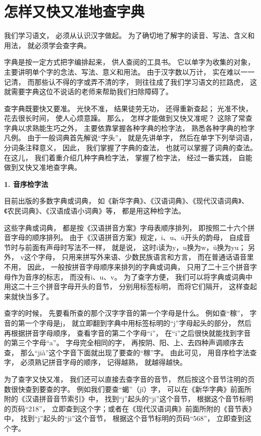 \section{怎样又快又准地查字典}

我们学习语文，
必须从认识汉字做起。
为了确切地了解字的读音、写法、含义和用法，
就必须学会查字典。

字典是按一定方式把字编排起来，
供人查阅的工具书。
它以单字为收集的对象，
主要讲明单个字的念法、写法、意义和用法。
由于汉字数以万计，
实在难以一一记清，
而那些认不得的字或弄不清的字，
则往往成了我们学习语文的拦路虎，
这就需要字典这位不说话的老师来帮助我们扫除障碍了。

查字典既要快又要准。
光快不准，
结果徒劳无功，
还得重新查起；
光准不快，
花去很长时间，
使人心烦意躁。
那么，
怎样才能做到又快又准呢？
这除了常查字典以求熟能生巧之外，
主要依靠掌握各种字典的检字法，
熟悉各种字典的检字凡例。
由于一般词典首先解说“字头”，
就是先讲单字，
然后在单字下列举词语，
分词条注释意义，
因此，
我们掌握了字典的查法，
也就可以掌握了词典的查法。
在这儿，
我们着重介绍几种字典检字法，
掌握了检字法，
经过一番实践，
自能做到又快又准地查字典。
\newpage

\textbf{1. 音序检字法}

目前出版的多数字典或词典，
如《新华字典》、《汉语词典》、《现代汉语词典》、《农民词典》、《汉语成语小词典》等，
都是用这种检字法。

这些字典或词典，
都是按《汉语拼音方案》字母表顺序排列，
即按照二十六个拼音字母的顺序排列。
由于《汉语拼音方案》规定，i、u、ü开头的韵母，
自成音节时与前面有声母时写法不一样，
就是说，
这时i读为y，u换为w，ü换为yu；
另外，
v这个字母，
只用来拼写外来语、少数民族语言和方言，
而在普通话语音里不用，
因此，
一般按拼音字母顺序来排列的字典或词典，
只用了二十三个拼音字母作为音序的标志，
而没有i、u、v。
为了查字方便，
我们可以将字典或词典中用这二十三个拼音字母开头的音节，
分别用标签标明，
而将它们隔开，
这样查起来就快当多了。

查字的时候，
先要看所查的那个汉字字音的第一个字母是什么。
例如查“稼”，
字音的第一个字母是j，
就立即翻到字典中用标签标明的“j”字母起头的部分，
然后再根据拼音字母顺序，
查看字音的第二个字母“i”，
在“i”之后很快就能找到字音的第三个字母“a”。
字母完全相同的字，
再按阴、阳、上、去四种声调顺序去查，
那么“jià”这个字音下面就出现了要查的“稼”字。
由此可见，
用音序检字法查字，
必须熟记拼音字母的顺序，
记得越熟，
就越得越快。

为了查字又快又准，
我们还可以直接去查字音的音节，
然后按这个音节注明的页数很快查到要查的字。
例如我们要查“蝎”（jǐ）字，
可以在《新华字典》前面所附的《汉语拼音音节索引》中，
找到“j”起头的“ji”这个音节，
根据这个音节标明的页码“218”，
立即查到这个字；或者在《现代汉语词典》前面所附的《音节表》中，
找到“j”起头的“ji”这个音节，
根据这个音节标明的页码“568”，
立即查到这个字。

